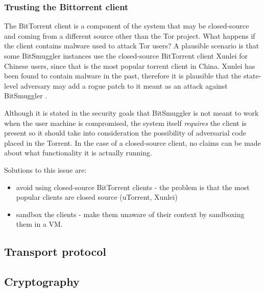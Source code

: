 \documentclass[11pt]{article} %
\newcommand{\projectName}{BitSmuggler }
\begin{document}

\subsubsection{Trusting the Bittorrent client}
\label{subsubsec:trustingBitTorrentClient}

The BitTorrent client is a component of the system that may be closed-source and coming from a different source other than the Tor project. What happens if the client contains malware used to attack Tor users? A plausible scenario is that some \projectName instances use the closed-source BitTorrent client Xunlei for Chinese users, since that is the most popular torrent client in China. Xunlei has been found to contain malware in the past, therefore it is plausible that the state-level adversary may add a rogue patch to it meant as an attack against \projectName.

Although it is stated in the security goals that \projectName is not meant to work when the user machine is compromised, the system itself \textit{requires} the client is present so it should take into consideration the possibility of adversarial code placed in the Torrent. In the case of a closed-source client, no claims can be made about what functionality it is actually running.

Solutions to this issue are:
\begin{itemize}
\item avoid using closed-source BitTorrent clients - the problem is that the most popular clients are closed source (uTorrent, Xunlei)
\item sandbox the clients - make them unaware of their context by sandboxing them in a VM.
\end{itemize}


\subsection{Transport protocol}


\subsection{Cryptography}
\end{document}
